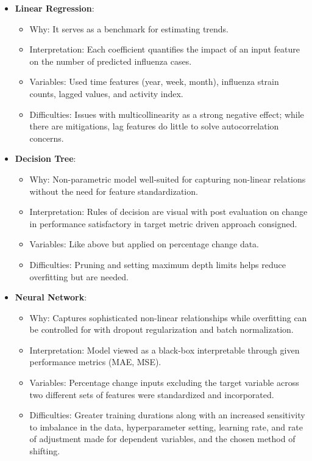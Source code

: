 \begin{itemize}
  \item \textbf{Linear Regression}:
  \begin{itemize}
    \item Why: It serves as a benchmark for estimating trends.
    \item Interpretation: Each coefficient quantifies the impact of an input feature on the number of predicted influenza cases.
    \item Variables: Used time features (year, week, month), influenza strain counts, lagged values, and activity index.
    \item Difficulties: Issues with multicollinearity as a strong negative effect; while there are mitigations, lag features do little to solve autocorrelation concerns.
  \end{itemize}
  \item \textbf{Decision Tree}:
  \begin{itemize}
    \item Why: Non-parametric model well-suited for capturing non-linear relations without the need for feature standardization.
    \item Interpretation: Rules of decision are visual with post evaluation on change in performance satisfactory in target metric driven approach consigned.
    \item Variables: Like above but applied on percentage change data.
    \item Difficulties: Pruning and setting maximum depth limits helps reduce overfitting but are needed.
  \end{itemize}
  \item \textbf{Neural Network}:
  \begin{itemize}
    \item Why: Captures sophisticated non-linear relationships while overfitting can be controlled for with dropout regularization and batch normalization.
    \item Interpretation: Model viewed as a black-box interpretable through given performance metrics (MAE, MSE).
    \item Variables: Percentage change inputs excluding the target variable across two different sets of features were standardized and incorporated.
    \item Difficulties: Greater training durations along with an increased sensitivity to imbalance in the data, hyperparameter setting, learning rate, and rate of adjustment made for dependent variables, and the chosen method of shifting.
  \end{itemize}
\end{itemize}


